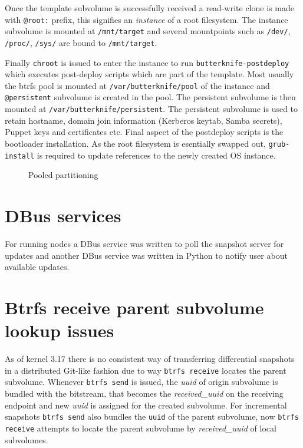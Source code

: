 \documentclass[a4paper,11pt]{kth-mag}
\begin{document}
Once the template subvolume is successfully received
a read-write clone is made with \lstinline!@root:! prefix,
this signifies an \emph{instance} of a root filesystem.
The instance subvolume is mounted at \lstinline!/mnt/target!
and several mountpoints such as \lstinline!/dev/!,
\lstinline!/proc/!, \lstinline!/sys/! are bound to \lstinline!/mnt/target!.

Finally \lstinline!chroot! is issued to enter the instance to
run \lstinline!butterknife-postdeploy! which executes
post-deploy scripts which are part of the template.
Most usually the \acrshort{btrfs} pool is mounted at \lstinline!/var/butterknife/pool!
of the instance and \lstinline!@persistent! subvolume is created
in the pool.
The persistent subvolume is then mounted at \lstinline!/var/butterknife/persistent!.
The persistent subvolume is used to retain hostname,
domain join information (Kerberos keytab, Samba secrets),
Puppet keys and certificates etc.
Final aspect of the postdeploy scripts is the
bootloader installation.
As the root filesystem is esentially swapped out,
\lstinline!grub-install! is required to update references
to the newly created OS instance.

\begin{figure}[!htb]
\centering
\scalebox{0.5}{}
\caption{Pooled partitioning}
\label{fig:pooled-partitioning}
\end{figure}


\section{DBus services}

For running nodes a DBus service was written to poll the snapshot server
for updates and another DBus service was written in Python to notify user
about available updates.

\section{Btrfs receive parent subvolume lookup issues}

As of kernel 3.17 there is no consistent way of transferring
differential snapshots in a distributed Git-like fashion due to way
\lstinline!btrfs receive! locates the parent subvolume.
Whenever \lstinline!btrfs send! is issued, the \emph{uuid} of origin
subvolume is bundled with the bitstream, that becomes
the \emph{received\_uuid} on the receiving endpoint and
new \emph{uuid} is assigned for the created subvolume.
For incremental snapshots \lstinline!btrfs send! also bundles
the \lstinline!uuid! of the parent subvolume,
now \lstinline!btrfs receive! attempts to locate the parent
subvolume by \emph{received\_uuid} of local subvolumes.
\end{document}
